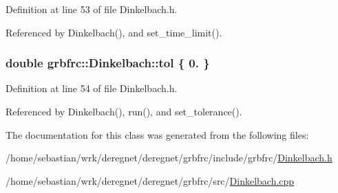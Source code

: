 Definition at line 53 of file Dinkelbach.\+h.



Referenced by Dinkelbach(), and set\+\_\+time\+\_\+limit().

\subsubsection[{\texorpdfstring{tol}{tol}}]{\setlength{\rightskip}{0pt plus 5cm}double grbfrc\+::\+Dinkelbach\+::tol \{ 0. \}\hspace{0.3cm}{\ttfamily [private]}}\hypertarget{classgrbfrc_1_1Dinkelbach_aa14d02fd3f14975d9ef118b18dfb5d87}{}\label{classgrbfrc_1_1Dinkelbach_aa14d02fd3f14975d9ef118b18dfb5d87}


Definition at line 54 of file Dinkelbach.\+h.



Referenced by Dinkelbach(), run(), and set\+\_\+tolerance().



The documentation for this class was generated from the following files\+:\begin{DoxyCompactItemize}
\item 
/home/sebastian/wrk/deregnet/deregnet/grbfrc/include/grbfrc/\hyperlink{Dinkelbach_8h}{Dinkelbach.\+h}\item 
/home/sebastian/wrk/deregnet/deregnet/grbfrc/src/\hyperlink{Dinkelbach_8cpp}{Dinkelbach.\+cpp}\end{DoxyCompactItemize}

